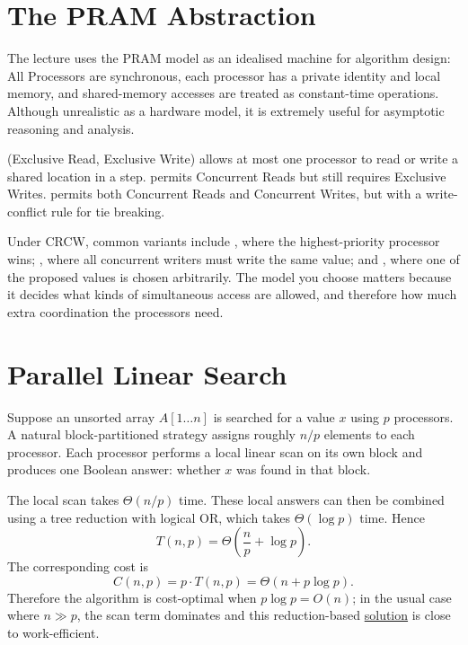 \section{The PRAM Abstraction}
The lecture uses the PRAM model as an idealised machine for algorithm design:
All Processors are synchronous, each processor has a private identity and local
memory, and shared-memory accesses are treated as constant-time operations.
Although unrealistic as a hardware model, it is extremely useful for asymptotic
reasoning and analysis.

\begin{ppdefn}
 (Exclusive Read, Exclusive Write) allows at most one processor to
read or write a shared location in a step.  permits Concurrent
Reads but still requires Exclusive Writes.  permits both Concurrent
Reads and Concurrent Writes, but with a write-conflict rule for tie breaking.
\end{ppdefn}

Under CRCW, common variants include , where the highest-priority
processor wins; , where all concurrent writers must write the
same value; and , where one of the proposed values is chosen
arbitrarily. The model you choose matters because it decides what kinds of 
simultaneous access are allowed, and therefore how much extra coordination the processors need.


\section{Parallel Linear Search}
Suppose an unsorted array $A[1 \dots n]$ is searched for a value $x$ using $p$
processors. A natural block-partitioned strategy assigns roughly $n/p$ elements
to each processor. Each processor performs a local linear scan on its own block
and produces one Boolean answer: whether $x$ was found in that block.

The local scan takes $\Theta(n/p)$ time. These local answers can then be combined
using a tree reduction with logical OR, which takes $\Theta(\log p)$ time. Hence
\[
T(n,p) = \Theta\left(\frac{n}{p} + \log p\right).
\]
The corresponding cost is
\[
C(n,p) = p \cdot T(n,p) = \Theta(n + p \log p).
\]
Therefore the algorithm is cost-optimal when $p \log p = O(n)$; in the usual
case where $n \gg p$, the scan term dominates and this reduction-based 
\hyperref[prog:block-partitioned-search]{solution} is
close to work-efficient.

